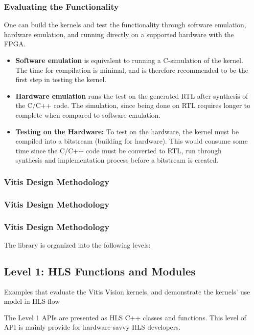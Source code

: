 \subsubsection{Evaluating the Functionality}
One can build the kernels and test the functionality through software emulation, hardware emulation, and running directly on a supported hardware with the FPGA.
\begin{itemize}
  \item \textbf{Software emulation} is equivalent to running a C-simulation of the kernel. The time for compilation is minimal, and is therefore recommended to be the first step in testing the kernel.
  \item \textbf{Hardware emulation} runs the test on the generated RTL after synthesis of the C/C++ code. The simulation, since being done on RTL requires longer to complete when compared to software emulation. 
  \item \textbf{Testing on the Hardware:} To test on the hardware, the kernel must be compiled into a bitstream (building for hardware). This would consume some time since the C/C++ code must be converted to RTL, run through synthesis and implementation process before a bitstream is created.
\end{itemize}




\iffalse

\subsubsection{Vitis Design Methodology}
\subsubsection{Vitis Design Methodology}
\subsubsection{Vitis Design Methodology}


The library is organized into the following levels: 
\subsection{Level 1: HLS Functions and Modules}
Examples that evaluate the Vitis Vision kernels, and demonstrate the kernels' use model in HLS flow

The Level 1 APIs are presented as HLS C++ classes and functions. This level of API is mainly provide for hardware-savvy HLS developers. 


